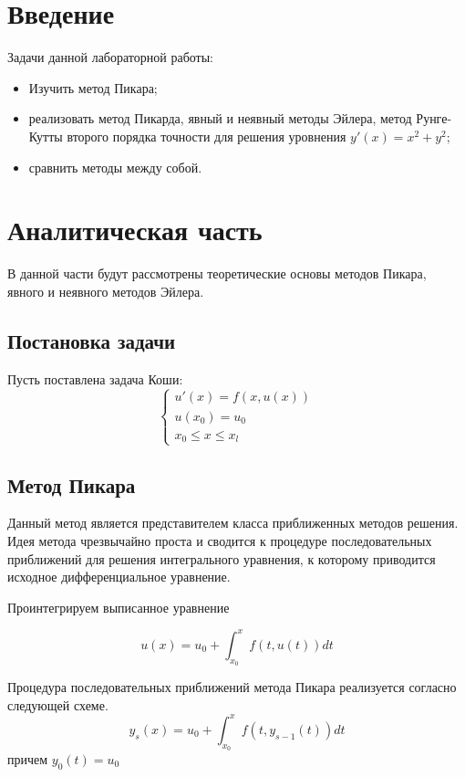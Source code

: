\documentclass[12pt]{report}
\begin{document}
\tableofcontents
\setcounter{page}{2}

\newpage
\chapter*{Введение}

Задачи данной лабораторной работы:
\begin{itemize}
	\item Изучить метод Пикара;
	\item реализовать метод Пикарда, явный и неявный методы Эйлера, метод Рунге-Кутты второго порядка точности для решения уровнения $y'(x) = x^2 + y^2$;
	\item сравнить методы между собой.
\end{itemize}
\chapter{Аналитическая часть}
В данной части будут рассмотрены теоретические основы методов Пикара, явного и неявного методов Эйлера. 

\section{Постановка задачи} 
Пусть поставлена задача Коши:
\begin{equation*}
	\begin{cases}
	u'(x) = f(x, u(x))\\
	u(x_0) = u_0 \\
	x_0 \leq x \leq x_l
	\end{cases}
\end{equation*}
\section{Метод Пикара}
Данный метод является представителем класса приближенных методов решения.
Идея метода чрезвычайно проста и сводится к процедуре последовательных приближений для решения интегрального уравнения, к которому приводится исходное дифференциальное уравнение.

Проинтегрируем выписанное уравнение

\begin{equation}
	u(x) = u_0 + \int_{x_0}^{x} f(t,u(t))dt
\end{equation}

Процедура последовательных приближений метода Пикара реализуется согласно следующей схеме.
\begin{equation}
y_s(x) = u_0 + \int_{x_0}^{x} f(t,y_{s-1}(t))dt
\end{equation}
причем $y_0(t) = u_0$
\end{document}
